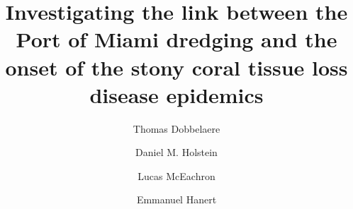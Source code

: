 \documentclass[preprint,12pt,authoryear]{elsarticle}
\begin{document}
\begin{frontmatter}



    \title{Investigating the link between the Port of Miami dredging and the onset of the stony coral tissue loss disease epidemics}
%
%
%

    \author[eli]{Thomas Dobbelaere}
    \author[lsu]{Daniel M. Holstein}
    \author[fwc]{Lucas McEachron}
    \author[eli,immc]{Emmanuel Hanert}


\end{frontmatter}
\end{document}

